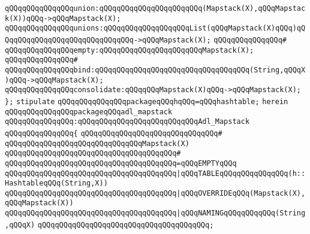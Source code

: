 \verb|qQQqqQQqqQQqqQQqunion:qQQqqQQqqQQqqQQqqQQqqQQq(Mapstack(X),qQQqMapstack(X))qQQq->qQQqMapstack(X);|\newline
\verb|qQQqqQQqqQQqqQQqunions:qQQqqQQqqQQqqQQqqQQqList(qQQqMapstack(X)qQQq)qQQqqQQqqQQqqQQqqQQqqQQqqQQqqQQq->qQQqMapstack(X);|\newline
\verb|qQQqqQQqqQQqqQQq#|\newline
\verb|qQQqqQQqqQQqqQQqempty:qQQqqQQqqQQqqQQqqQQqqQQqMapstack(X);|\newline
\verb|qQQqqQQqqQQqqQQq#|\newline
\verb|qQQqqQQqqQQqqQQqbind:qQQqqQQqqQQqqQQqqQQqqQQqqQQqqQQqqQQq(String,qQQqX)qQQq->qQQqMapstack(X);|\newline
\verb|qQQqqQQqqQQqqQQqconsolidate:qQQqqQQqMapstack(X)qQQq->qQQqMapstack(X);|\newline
\verb|};|\newline
\newline
\newline
\newline
\verb|stipulate|\newline
\verb|qQQqqQQqqQQqqQQqpackageqQQqhqQQq=qQQqhashtable;|\newline
\verb|herein|\newline
\newline
\verb|qQQqqQQqqQQqqQQqpackageqQQqadl_mapstack|\newline
\verb|qQQqqQQqqQQqqQQq:qQQqqQQqqQQqqQQqqQQqqQQqqQQqAdl_Mapstack|\newline
\verb|qQQqqQQqqQQqqQQq{|\newline
\verb|qQQqqQQqqQQqqQQqqQQqqQQqqQQqqQQq#|\newline
\verb|qQQqqQQqqQQqqQQqqQQqqQQqqQQqqQQqMapstack(X)|\newline
\verb|qQQqqQQqqQQqqQQqqQQqqQQqqQQqqQQqqQQqqQQq#|\newline
\verb|qQQqqQQqqQQqqQQqqQQqqQQqqQQqqQQqqQQqqQQq=qQQqEMPTYqQQq|\newline
\verb|qQQqqQQqqQQqqQQqqQQqqQQqqQQqqQQqqQQqqQQq|\verb#|qQQqTABLEqQQqqQQqqQQqqQQq(h::HashtableqQQq(String,X))#\newline
\verb|qQQqqQQqqQQqqQQqqQQqqQQqqQQqqQQqqQQqqQQq|\verb#|qQQqOVERRIDEqQQq(Mapstack(X),qQQqMapstack(X))#\newline
\verb|qQQqqQQqqQQqqQQqqQQqqQQqqQQqqQQqqQQqqQQq|\verb#|qQQqNAMINGqQQqqQQqqQQq(String,qQQqX)#\newline
\verb|qQQqqQQqqQQqqQQqqQQqqQQqqQQqqQQqqQQqqQQq;|\newline
\newline

